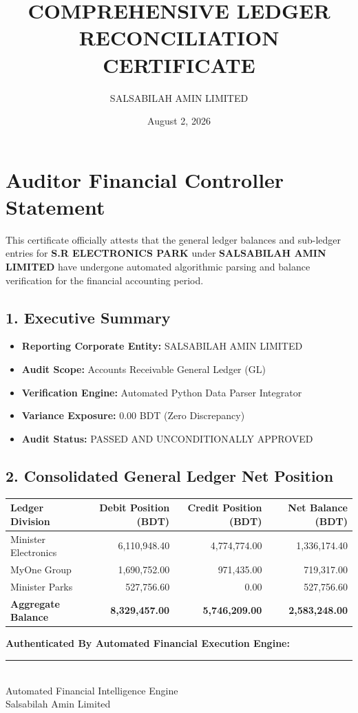\documentclass[11pt,a4paper]{article}
\title{\textbf{COMPREHENSIVE LEDGER RECONCILIATION CERTIFICATE}}
\author{SALSABILAH AMIN LIMITED}
\date{August 2, 2026}
\begin{document}
\maketitle

\section*{Auditor Financial Controller Statement}
This certificate officially attests that the general ledger balances and sub-ledger entries for \textbf{S.R ELECTRONICS PARK} under \textbf{SALSABILAH AMIN LIMITED} have undergone automated algorithmic parsing and balance verification for the financial accounting period.

\subsection*{1. Executive Summary}
\begin{itemize}
    \item \textbf{Reporting Corporate Entity:} SALSABILAH AMIN LIMITED
    \item \textbf{Audit Scope:} Accounts Receivable General Ledger (GL)
    \item \textbf{Verification Engine:} Automated Python Data Parser Integrator
    \item \textbf{Variance Exposure:} 0.00 BDT (Zero Discrepancy)
    \item \textbf{Audit Status:} PASSED AND UNCONDITIONALLY APPROVED
\end{itemize}

\subsection*{2. Consolidated General Ledger Net Position}
\begin{center}
\begin{tabular}{|l|r|r|r|}
\hline
\textbf{Ledger Division} & \textbf{Debit Position (BDT)} & \textbf{Credit Position (BDT)} & \textbf{Net Balance (BDT)} \\
\hline
Minister Electronics & 6,110,948.40 & 4,774,774.00 & 1,336,174.40 \\
MyOne Group & 1,690,752.00 & 971,435.00 & 719,317.00 \\
Minister Parks & 527,756.60 & 0.00 & 527,756.60 \\
\hline
\textbf{Aggregate Balance} & \textbf{8,329,457.00} & \textbf{5,746,209.00} & \textbf{2,583,248.00} \\
\hline
\end{tabular}
\end{center}

\vspace{2cm}
\noindent
\textbf{Authenticated By Automated Financial Execution Engine:}\\[1.5cm]
\rule{6cm}{0.4pt}\\
Automated Financial Intelligence Engine\\
Salsabilah Amin Limited
\end{document}
